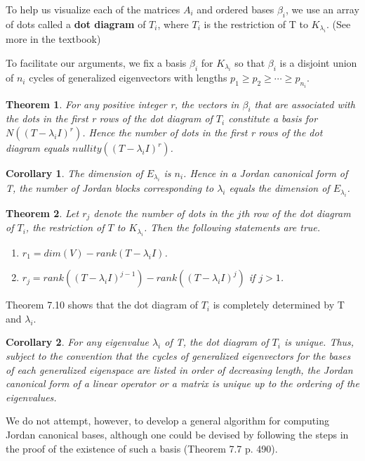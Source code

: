 \documentclass{article}
\newcommand{\bd}[1]{\textbf{#1}}
\newcommand{\enumalph}[0]{\begin{enumerate}[label=(\alph*)]}
\theoremstyle{plain}
\newtheorem{theorem}{Theorem}[section]
\newtheorem*{corollary}{Corollary}
\theoremstyle{plain} %
\begin{document}
To help us visualize each of the matrices $A_i$ and ordered bases $\beta_i$, we use an array of dots called a \bd{dot diagram} of $T_i$, where $T_i$ is the restriction of T to $K_{\lambda_i}$.  (See more in the textbook)

To facilitate our arguments, we fix a basis $\beta_i$ for $K_{\lambda_i}$ so that $\beta_i$ is a disjoint union of $n_i$ cycles of generalized eigenvectors with lengths $p_1 \geq p_2 \geq \cdots \geq p_{n_i}$.

\begin{theorem}
  For any positive integer r, the vectors in $\beta_i$ that are associated with the dots in the first r rows of the dot diagram of $T_i$ constitute a basis for $N((T −\lambda_iI)^r)$. Hence the number of dots in the first r rows of the dot diagram equals $nullity((T − \lambda_iI)^r)$.
\end{theorem}

\begin{corollary}
  The dimension of $E_{\lambda_i}$ is $n_i$. Hence in a Jordan canonical form of T, the number of Jordan blocks  corresponding to $\lambda_i$ equals the dimension of $E_{\lambda_i}$.
\end{corollary}

\begin{theorem}
  Let $r_j$ denote the number of dots in the $j$th row of the dot diagram of $T_i$, the restriction of $T$ to $K_{\lambda_i}$. Then the following statements are true.
  \enumalph
  \item $r_1 = dim(V) - rank(T-\lambda_iI)$.
  \item $r_j = rank((T-\lambda_i I)^{j-1}) - rank((T-\lambda_iI)^j)$ if $j>1$.
  \end{enumerate}
\end{theorem}

Theorem 7.10 shows that the dot diagram of $T_i$ is completely determined by T and $\lambda_i$.

\begin{corollary}
  For any eigenvalue $\lambda_i$ of T, the dot diagram of $T_i$ is unique. Thus, subject to the convention that the cycles of generalized eigenvectors for the bases of each generalized eigenspace are listed in order of decreasing length, the Jordan canonical form of a linear operator or a matrix is unique up to the ordering of the eigenvalues.
\end{corollary}

We do not attempt, however, to develop a general algorithm for computing Jordan canonical bases, although one could be devised by following the steps in the proof of the existence of such a basis (Theorem 7.7 p. 490).
\end{document}
